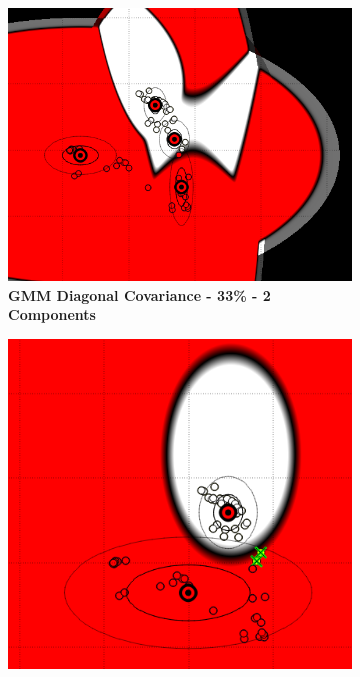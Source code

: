 \begin{figure} [ht]
\centering
	\begin{subfigure}[h]{0.30\textwidth}
    \centering
	\includegraphics[height=0.13\textheight]{./classification/gmm_diag_cov_33pourcent_2gmm.png}
	\caption{\bf GMM Diagonal Covariance - 33\% - 2 Components}
	\end{subfigure}
    \hspace{3mm}
    \begin{subfigure}[h]{0.3\textwidth}
    \centering
    \includegraphics[height=0.13\textheight]{./classification/gmm_diag_cov_100pourcent_1gmm.png}

\end{subfigure}
\end{figure}
